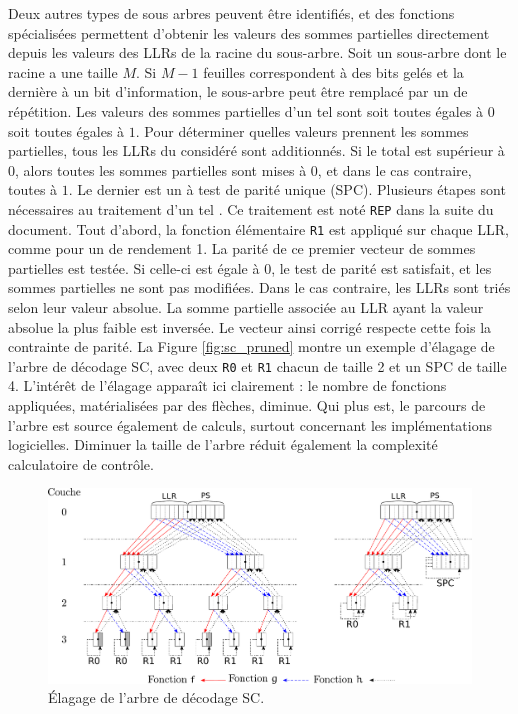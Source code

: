 Deux autres types de sous arbres peuvent être identifiés, et des fonctions spécialisées permettent d'obtenir les valeurs des sommes partielles directement depuis les valeurs des LLRs de la racine du sous-arbre. Soit un sous-arbre dont le \noeud racine a une taille $M$. Si $M-1$ feuilles correspondent à des bits gelés et la dernière à un bit d'information, le sous-arbre peut être remplacé par un \noeud de répétition. Les valeurs des sommes partielles d'un tel \noeud sont soit toutes égales à $0$ soit toutes égales à $1$. Pour déterminer quelles valeurs prennent les sommes partielles, tous les LLRs du \noeud considéré sont additionnés. Si le total est supérieur à 0, alors toutes les sommes partielles sont mises à $0$, et dans le cas contraire, toutes à $1$. Le dernier est un \noeud à test de parité unique (SPC). Plusieurs étapes sont nécessaires au traitement d'un tel \noeud. Ce traitement est noté \texttt{REP} dans la suite du document. Tout d'abord, la fonction élémentaire \texttt{R1} est appliqué sur chaque LLR, comme pour un \noeud de rendement 1. La parité de ce premier vecteur de sommes partielles est testée. Si celle-ci est égale à 0, le test de parité est satisfait, et les sommes partielles ne sont pas modifiées. Dans le cas contraire, les LLRs sont triés selon leur valeur absolue. La somme partielle associée au LLR ayant la valeur absolue la plus faible est inversée. Le vecteur ainsi corrigé respecte cette fois la contrainte de parité. La Figure \ref{fig:sc_pruned} montre un exemple d'élagage de l'arbre de décodage SC, avec deux \noeuds \texttt{R0} et \texttt{R1} chacun de taille 2 et un \noeud SPC de taille 4. L'intérêt de l'élagage apparaît ici clairement : le nombre de fonctions appliquées, matérialisées par des flèches, diminue. Qui plus est, le parcours de l'arbre est source également de calculs, surtout concernant les implémentations logicielles. Diminuer la taille de l'arbre réduit également la complexité calculatoire de contrôle.

\begin{figure}[h]
  \centering
  \includegraphics[width=\textwidth]{main/ch1_fig/sc_tree_pruned.pdf}
  \caption{\'Elagage de l'arbre de décodage SC.}
  \label{fig:bp_scan}
\end{figure}

